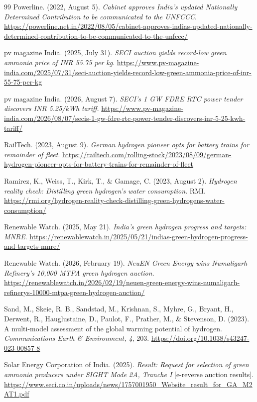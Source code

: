 {\begin{thebibliography}{99}
 Powerline. (2022, August 5). \emph{Cabinet approves India's updated Nationally Determined Contribution to be communicated to the UNFCCC}. \url{https://powerline.net.in/2022/08/05/cabinet-approves-indias-updated-nationally-determined-contribution-to-be-communicated-to-the-unfccc/}

 pv magazine India. (2025, July 31). \emph{SECI auction yields record-low green ammonia price of INR 55.75 per kg}. \url{https://www.pv-magazine-india.com/2025/07/31/seci-auction-yields-record-low-green-ammonia-price-of-inr-55-75-per-kg}

 pv magazine India. (2026, August 7). \emph{SECI's 1 GW FDRE RTC power tender discovers INR 5.25/kWh tariff}. \url{https://www.pv-magazine-india.com/2026/08/07/secis-1-gw-fdre-rtc-power-tender-discovers-inr-5-25-kwh-tariff/}

 RailTech. (2023, August 9). \emph{German hydrogen pioneer opts for battery trains for remainder of fleet}. \url{https://railtech.com/rolling-stock/2023/08/09/german-hydrogen-pioneer-opts-for-battery-trains-for-remainder-of-fleet}

 Ramirez, K., Weiss, T., Kirk, T., \& Gamage, C. (2023, August 2). \emph{Hydrogen reality check: Distilling green hydrogen's water consumption}. RMI. \url{https://rmi.org/hydrogen-reality-check-distilling-green-hydrogens-water-consumption/}

 Renewable Watch. (2025, May 21). \emph{India's green hydrogen progress and targets: MNRE}. \url{https://renewablewatch.in/2025/05/21/indias-green-hydrogen-progress-and-targets-mnre/}

 Renewable Watch. (2026, February 19). \emph{NeuEN Green Energy wins Numaligarh Refinery's 10,000 MTPA green hydrogen auction}. \url{https://renewablewatch.in/2026/02/19/neuen-green-energy-wins-numaligarh-refinerys-10000-mtpa-green-hydrogen-auction/}

 Sand, M., Skeie, R. B., Sandstad, M., Krishnan, S., Myhre, G., Bryant, H., Derwent, R., Hauglustaine, D., Paulot, F., Prather, M., \& Stevenson, D. (2023). A multi-model assessment of the global warming potential of hydrogen. \emph{Communications Earth \& Environment, 4}, 203. \url{https://doi.org/10.1038/s43247-023-00857-8}

 Solar Energy Corporation of India. (2025). \emph{Result: Request for selection of green ammonia producers under SIGHT Mode 2A, Tranche I} [e-reverse auction results]. \url{https://www.seci.co.in/uploads/news/1757001950_Website_result_for_GA_M2AT1.pdf}


\end{thebibliography}}

